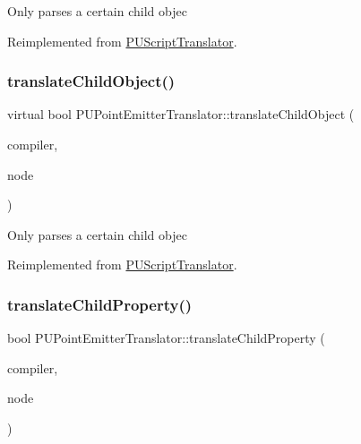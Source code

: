 Only parses a certain child objec 

Reimplemented from \hyperlink{classPUScriptTranslator_ab587d01348ae3e678cb700c719b2b113}{P\+U\+Script\+Translator}.

\mbox{\label{classPUPointEmitterTranslator_a3a2eb9f379dc1890ccfcc3930f46af92}} 
\subsubsection{\texorpdfstring{translate\+Child\+Object()}{translateChildObject()}\hspace{0.1cm}{\footnotesize\ttfamily [2/2]}}
{\footnotesize\ttfamily virtual bool P\+U\+Point\+Emitter\+Translator\+::translate\+Child\+Object (\begin{DoxyParamCaption}\item[{\hyperlink{classPUScriptCompiler}{P\+U\+Script\+Compiler} $\ast$}]{compiler,  }\item[{\hyperlink{classPUAbstractNode}{P\+U\+Abstract\+Node} $\ast$}]{node }\end{DoxyParamCaption})\hspace{0.3cm}{\ttfamily [virtual]}}

Only parses a certain child objec 

Reimplemented from \hyperlink{classPUScriptTranslator_ab587d01348ae3e678cb700c719b2b113}{P\+U\+Script\+Translator}.

\mbox{\label{classPUPointEmitterTranslator_a5c08eb85b24737288c9dddaaab08c1dd}} 
\subsubsection{\texorpdfstring{translate\+Child\+Property()}{translateChildProperty()}\hspace{0.1cm}{\footnotesize\ttfamily [1/2]}}
{\footnotesize\ttfamily bool P\+U\+Point\+Emitter\+Translator\+::translate\+Child\+Property (\begin{DoxyParamCaption}\item[{\hyperlink{classPUScriptCompiler}{P\+U\+Script\+Compiler} $\ast$}]{compiler,  }\item[{\hyperlink{classPUAbstractNode}{P\+U\+Abstract\+Node} $\ast$}]{node }\end{DoxyParamCaption})\hspace{0.3cm}{\ttfamily [virtual]}}


